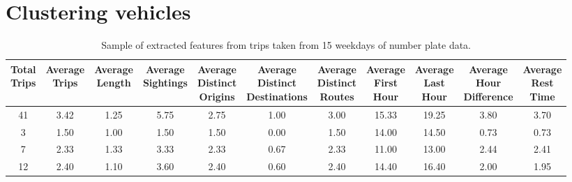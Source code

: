 \section{Clustering vehicles}\label{s.classification}

\begin{table*}[t]
\centering
\begin{tabular}{c c c c c c c c c c c}
  \hline
 \thead{Total\\Trips} & \thead{Average\\Trips} & \thead{Average\\Length} & \thead{Average\\Sightings} & \thead{Average\\Distinct\\Origins} & \thead{Average\\Distinct\\Destinations} & \thead{Average\\Distinct\\Routes} & \thead{Average\\First\\Hour} & \thead{Average\\Last\\Hour} & \thead{Average\\Hour\\Difference} & \thead{Average\\Rest\\Time} \\
  \hline
41 & 3.42 & 1.25 & 5.75 & 2.75 & 1.00 & 3.00 & 15.33 & 19.25 & 3.80 & 3.70 \\
3 & 1.50 & 1.00 & 1.50 & 1.50 & 0.00 & 1.50 & 14.00 & 14.50 & 0.73 & 0.73 \\
7 & 2.33 & 1.33 & 3.33 & 2.33 & 0.67 & 2.33 & 11.00 & 13.00 & 2.44 & 2.41 \\
12 & 2.40 & 1.10 & 3.60 & 2.40 & 0.60 & 2.40 & 14.40 & 16.40 & 2.00 & 1.95 \\
   \hline
\end{tabular}
\caption{Sample of extracted features from trips taken from 15 weekdays of number plate data.}
\label{t:features}
\end{table*}


